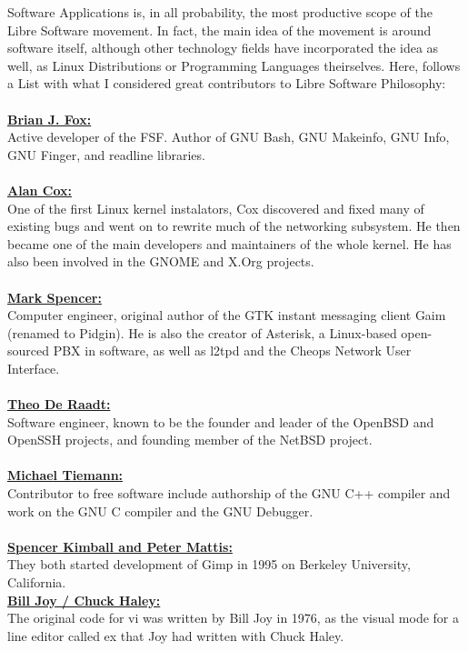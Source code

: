 \documentclass[10pt, a4paper, oneside]{report}
\begin{document}
Software Applications is, in all probability, the most productive scope of the Libre Software movement. In fact, the main idea of the movement is around software itself, although other technology fields have incorporated the idea as well, as Linux Distributions or Programming Languages theirselves.
Here, follows a List with what I considered great contributors to Libre Software Philosophy:\\
\\
\textbf{\underline{Brian J. Fox:}}\\
Active developer of the FSF. Author of GNU Bash, GNU Makeinfo, GNU Info, GNU Finger, and readline libraries.\\
\\
\textbf{\underline{Alan Cox:}}\\
One of the first Linux kernel instalators, Cox discovered and fixed many of existing bugs and went on to rewrite much of the networking subsystem. 
He then became one of the main developers and maintainers of the whole kernel.
He has also been involved in the GNOME and X.Org projects.\\
\\
\textbf{\underline{Mark Spencer:}}\\
Computer engineer, original author of the GTK instant messaging client Gaim (renamed to Pidgin).
He is also the creator of Asterisk, a Linux-based open-sourced PBX in software, as well as l2tpd and the Cheops Network User Interface.\\
\\
\textbf{\underline{Theo De Raadt:}}\\
Software engineer, known to be the founder and leader of the OpenBSD and OpenSSH projects, and founding member of the NetBSD project.\\
\\
\textbf{\underline{Michael Tiemann:}}\\
Contributor to free software include authorship of the GNU C++ compiler and work on the GNU C compiler and the GNU Debugger.\\
\\
\textbf{\underline{Spencer Kimball and Peter Mattis:}}\\
They both started development of Gimp in 1995 on Berkeley University, California.\\
\newpage
{\noindent}\textbf{\underline{Bill Joy / Chuck Haley:}}\\
The original code for vi was written by Bill Joy in 1976, as the visual mode for a line editor called ex that Joy had written with Chuck Haley.\\ 
\end{document}
